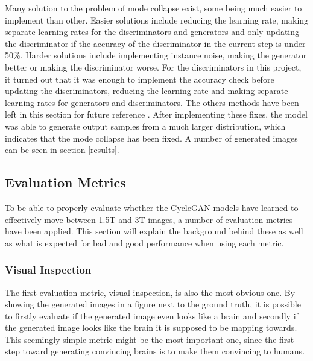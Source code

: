 \documentclass[12pt, fleqn, titlepage]{article}
\begin{document}
Many solution to the problem of mode collapse exist, some being much easier to implement than other. Easier solutions include reducing the learning rate, making separate learning rates for the discriminators and generators and only updating the discriminator if the accuracy of the discriminator in the current step is under 50\%. Harder solutions include implementing instance noise, making the generator better or making the discriminator worse. For the discriminators in this project, it turned out that it was enough to implement the accuracy check before updating the discriminators, reducing the learning rate and making separate learning rates for generators and discriminators. The others methods have been left in this section for future reference \cite{mode_collapse_reddit_fix}\cite{mode_collapse_github}. After implementing these fixes, the model was able to generate output samples from a much larger distribution, which indicates that the mode collapse has been fixed. A number of generated images can be seen in section \ref{results}.


\subsection{Evaluation Metrics}\label{evaluation_metrics}
To be able to properly evaluate whether the CycleGAN models have learned to effectively move between 1.5T and 3T images, a number of evaluation metrics have been applied. This section will explain the background behind these as well as what is expected for bad and good performance when using each metric.

\subsubsection{Visual Inspection}\label{visual_inspection}
The first evaluation metric, visual inspection, is also the most obvious one. By showing the generated images in a figure next to the ground truth, it is possible to firstly evaluate if the generated image even looks like a brain and secondly if the generated image looks like the brain it is supposed to be mapping towards. This seemingly simple metric might be the most important one, since the first step toward generating convincing brains is to make them convincing to humans.
\end{document}
